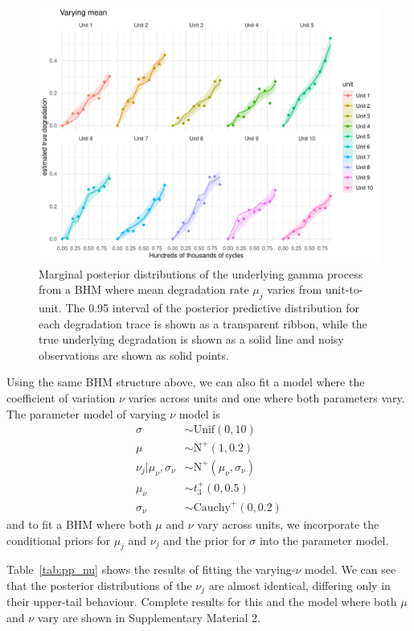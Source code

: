 \documentclass{article}
\begin{document}
\begin{figure}[t]
    \centering
    \includegraphics[width=0.8\columnwidth]{../figures/plot-pp-mu-filtered.pdf}
    \caption{Marginal posterior distributions of the underlying gamma process from a BHM where mean degradation rate $\mu_j$ varies from unit-to-unit. The 0.95 interval of the posterior predictive distribution for each degradation trace is shown as a transparent ribbon, while the true underlying degradation is shown as a solid line and noisy observations are shown as solid points.}
    \label{fig:pp_mu_filtered}
\end{figure}

Using the same BHM structure above, we can also fit a model where the coefficient of variation $\nu$ varies across units and one where both parameters vary. The parameter model of varying $\nu$ model is 
\begin{align*}
    \sigma & \sim \mbox{Unif}(0, 10) \\
    \mu & \sim \mbox{N}^{+}(1, 0.2) \\
    \nu_j | \mu_\nu, \sigma_\nu  & \sim \mbox{N}^{+}(\mu_{\nu}, \sigma_{\nu}) \\
    \mu_\nu & \sim t^{+}_3(0, 0.5) \\
    \sigma_\nu & \sim \mbox{Cauchy}^{+}(0, 0.2)
\end{align*}
and to fit a BHM where both $\mu$ and $\nu$ vary across units, we incorporate the conditional priors for $\mu_j$ and $\nu_j$ and the prior for $\sigma$ into the parameter model.

Table~\ref{tab:pp_nu} shows the results of fitting the varying-$\nu$ model. We can see that the posterior distributions of the $\nu_j$ are almost identical, differing only in their upper-tail behaviour. Complete results for this and the model where both $\mu$ and $\nu$ vary are shown in Supplementary Material 2.
\end{document}
